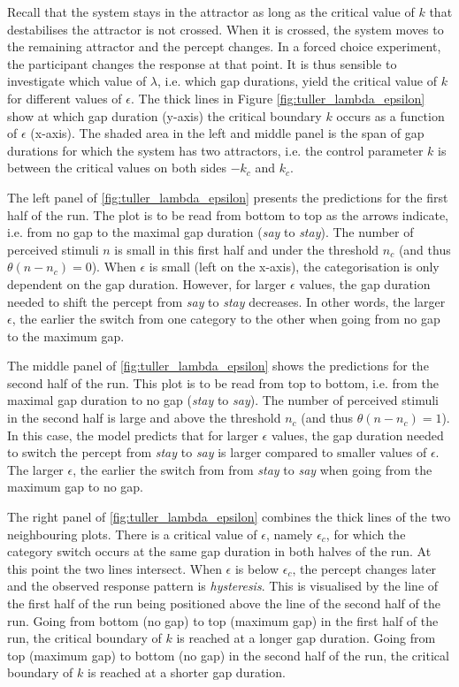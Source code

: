 Recall that the system stays in the attractor as long as the critical value of $k$ that destabilises the attractor is not crossed. When it is crossed, the system moves to the remaining attractor and the percept changes. In a forced choice experiment, the participant changes the response at that point. It is thus sensible to investigate which value of $\lambda$, i.e. which gap durations, yield the critical value of $k$ for different values of $\epsilon$. The thick lines in Figure \ref{fig:tuller_lambda_epsilon} show at which gap duration (y-axis) the critical boundary $k$ occurs as a function of $\epsilon$ (x-axis). The shaded area in the left and middle panel is the span of gap durations for which the system has two attractors, i.e. the control parameter $k$ is between the critical values on both sides $-k_c$ and $k_c$.

The left panel of \ref{fig:tuller_lambda_epsilon} presents the predictions for the first half of the run. The plot is to be read from bottom to top as the arrows indicate, i.e. from no gap to the maximal gap duration (\emph{say} to \emph{stay}). The number of perceived stimuli $n$ is small in this first half and under the threshold  $n_c$ (and thus $\theta(n-n_c) = 0$). When $\epsilon$ is small (left on the x-axis), the categorisation is only dependent on the gap duration. However, for larger $\epsilon$ values, the gap duration needed to shift the percept from \emph{say} to \emph{stay} decreases. In other words, the larger $\epsilon$, the earlier the switch from one category to the other when going from no gap to the maximum gap.

The middle panel of \ref{fig:tuller_lambda_epsilon} shows the predictions for the second half of the run. This plot is to be read from top to bottom, i.e. from the maximal gap duration to no gap (\emph{stay} to \emph{say}). The number of perceived stimuli in the second half is large and above the threshold $n_c$ (and thus $\theta(n-n_c) = 1$). In this case, the model predicts that for larger $\epsilon$ values, the gap duration needed to switch the percept from \emph{stay} to \emph{say} is larger compared to smaller values of $\epsilon$. The larger $\epsilon$, the earlier the switch from from \emph{stay} to \emph{say} when going from the maximum gap to no gap.

The right panel of \ref{fig:tuller_lambda_epsilon} combines the thick lines of the two neighbouring plots. There is a critical value of $\epsilon$, namely $\epsilon_c$, for which the category switch occurs at the same gap duration in both halves of the run. At this point the two lines intersect. When $\epsilon$ is below $\epsilon_c$, the percept changes later and the observed response pattern is \emph{hysteresis}. This is visualised by the line of the first half of the run being positioned above the line of the second half of the run. Going from bottom (no gap) to top (maximum gap) in the first half of the run, the critical boundary of $k$ is reached at a longer gap duration. Going from top (maximum gap) to bottom (no gap) in the second half of the run, the critical boundary of $k$ is reached at a shorter gap duration. 


